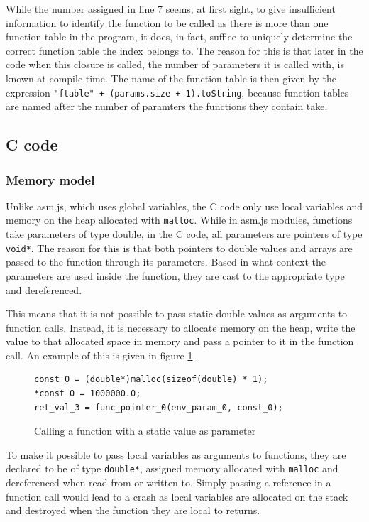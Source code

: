 \documentclass[11pt]{report}
\begin{document}
While the number assigned in line 7 seems, at first sight, to give insufficient information to identify the function to be called as there is more than one function table in the program, it does, in fact, suffice to uniquely determine the correct function table the index belongs to. The reason for this is that later in the code when this closure is called, the number of parameters it is called with, is known at compile time. The name of the function table is then given by the expression \texttt{"ftable" + (params.size + 1).toString}, because function tables are named after the number of paramters the functions they contain take.


\subsection{C code}
\subsubsection{Memory model}
Unlike asm.js, which uses global variables, the C code only use local variables and memory on the heap allocated with \texttt{malloc}. While in asm.js modules, functions take parameters of type double, in the C code, all parameters are pointers of type \texttt{void*}. The reason for this is that both pointers to double values and arrays are passed to the function through its parameters. Based in what context the parameters are used inside the function, they are cast to the appropriate type and dereferenced.

This means that it is not possible to pass static double values as arguments to function calls. Instead, it is necessary to allocate memory on the heap, write the value to that allocated space in memory and pass a pointer to it in the function call. An example of this is given in figure \ref{icmm1}.

\begin{figure}[ht]
\begin{lstlisting}
const_0 = (double*)malloc(sizeof(double) * 1);
*const_0 = 1000000.0;
ret_val_3 = func_pointer_0(env_param_0, const_0);
\end{lstlisting}
\caption{Calling a function with a static value as parameter}
\label{icmm1}
\end{figure}

To make it possible to pass local variables as arguments to functions, they are declared to be of type \texttt{double*}, assigned memory allocated with \texttt{malloc} and dereferenced when read from or written to. Simply passing a reference in a function call would lead to a crash as local variables are allocated on the stack and destroyed when the function they are local to returns.
\end{document}

